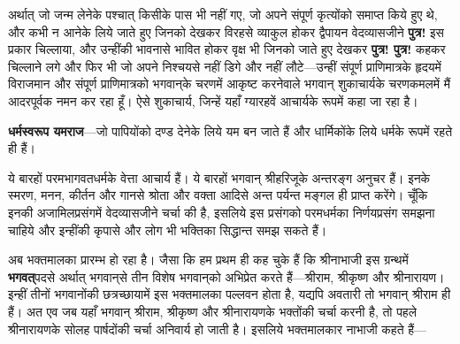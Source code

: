 \begin{sloppypar}\justifying{}
अर्थात् जो जन्म लेनेके पश्चात् किसीके पास भी नहीं गए, जो अपने संपूर्ण कृत्योंको समाप्त किये हुए थे, और कभी न आनेके लिये जाते हुए जिनको देखकर विरहसे व्याकुल होकर द्वैपायन वेदव्यासजीने \textbf{पुत्र!} इस प्रकार चिल्लाया, और उन्हींकी भावनासे भावित होकर वृक्ष भी जिनको जाते हुए देखकर \textbf{पुत्र! पुत्र!} कहकर चिल्लाने लगे और फिर भी जो अपने निश्चयसे नहीं डिगे और नहीं लौटे—उन्हीं संपूर्ण प्राणिमात्रके हृदयमें विराजमान और संपूर्ण प्राणिमात्रको भगवान्‌के चरणमें आकृष्ट करनेवाले भगवान् शुकाचार्यके चरणकमलमें मैं आदरपूर्वक नमन कर रहा हूँ। ऐसे शुकाचार्य, जिन्हें यहाँ ग्यारहवें आचार्यके रूपमें कहा जा रहा है।
\end{sloppypar}
\begin{sloppypar}\justifying{}
\textbf{धर्मस्वरूप यमराज}—जो पापियोंको दण्ड देनेके लिये यम बन जाते हैं और धार्मिकोंके लिये धर्मके रूपमें रहते ही हैं।
\end{sloppypar}
\begin{sloppypar}\justifying{}
ये बारहों परम\-भागवत\-धर्मके वेत्ता आचार्य हैं। ये बारहों भगवान् श्रीहरिजूके अन्तरङ्ग अनुचर हैं। इनके स्मरण, मनन, कीर्तन और गानसे श्रोता और वक्ता आदिसे अन्त पर्यन्त मङ्गल ही प्राप्त करेंगे। चूँकि इनकी अजामिल\-प्रसंगमें वेदव्यासजीने चर्चा की है, इसलिये इस प्रसंगको परमधर्मका निर्णय\-प्रसंग समझना चाहिये और इन्हींकी कृपासे और लोग भी भक्तिका सिद्धान्त समझ सकते हैं।
\end{sloppypar}
\begin{sloppypar}\justifying{}
अब भक्तमालका प्रारम्भ हो रहा है। जैसा कि हम प्रथम ही कह चुके हैं कि श्रीनाभाजी इस ग्रन्थमें \textbf{भगवत्}पदसे अर्थात् भगवान्‌से तीन विशेष भगवान्‌को अभिप्रेत करते हैं—श्रीराम, श्रीकृष्ण और श्रीनारायण। इन्हीं तीनों भगवानोंकी छत्रच्छायामें इस भक्तमालका पल्लवन होता है, यद्यपि अवतारी तो भगवान् श्रीराम ही हैं। अत एव जब यहाँ भगवान् श्रीराम, श्रीकृष्ण और श्रीनारायणके भक्तोंकी चर्चा करनी है, तो पहले श्रीनारायणके सोलह पार्षदोंकी चर्चा अनिवार्य हो जाती है। इसलिये भक्तमालकार नाभाजी कहते हैं—
\end{sloppypar}



